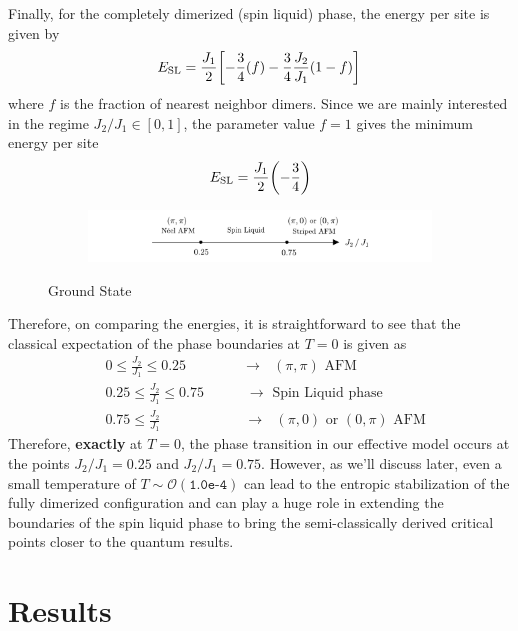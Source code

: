 \documentclass[../journal_main.tex]{subfiles}
\begin{document}
Finally, for the completely dimerized (spin liquid) phase, the energy per site is given by
\begin{equation*}
    E_{\text{SL}} = \frac{J_1}{2} \qty[-\frac{3}{4}(f) - \frac{3}{4}\frac{J_2}{J_1}(1-f)]
\end{equation*}
where $f$ is the fraction of nearest neighbor dimers. Since we are mainly interested in the regime $J_2/J_1 \in [0, 1]$, the parameter value $f = 1$ gives the minimum energy per site
\begin{equation}
    E_{\text{SL}} = \frac{J_1}{2} \qty(-\frac{3}{4})
\end{equation}
\begin{figure}[t!]
    \centering
    \begin{subfigure}[b]{1.0\textwidth}  %
        \begin{center}
            \includegraphics[width=\textwidth]{images/j1-j2/classical-expectation.pdf}
        \end{center}
    \end{subfigure}
    \caption{Ground State}
    \label{}
\end{figure}
\!\!\!\!\!\!\!\!\!\!\!
Therefore, on comparing the energies, it is straightforward to see that the classical expectation of the phase boundaries at $T = 0$ is given as
\begin{align*}
    &0 \leq \frac{J_2}{J_1} \leq 0.25 \qquad \qquad \longrightarrow \text{ $(\pi, \pi)$ AFM} \\
    &0.25 \leq \frac{J_2}{J_1} \leq 0.75 \quad\qquad \longrightarrow \text{ Spin Liquid phase} \\
    &0.75 \leq \frac{J_2}{J_1} \qquad \qquad \qquad \longrightarrow \text{ $(\pi, 0)$ or $(0, \pi)$  AFM}
\end{align*}
Therefore, \textbf{exactly} at $T=0$, the phase transition in our effective model occurs at the points $J_2/J_1 = 0.25$ and $J_2/J_1 = 0.75$. However, as we'll discuss later, even a small temperature of $T\sim \mathcal{O}(\texttt{1.0e-4})$ can lead to the entropic stabilization of the fully dimerized configuration and can play a huge role in extending the boundaries of the spin liquid phase to bring the semi-classically derived critical points closer to the quantum results.

\section{Results}
\end{document}
